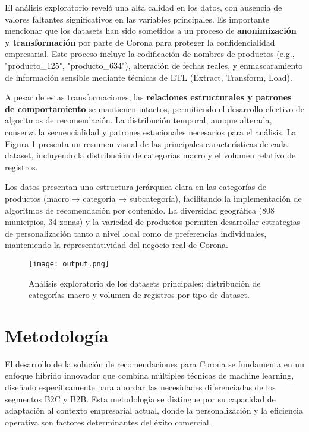 \documentclass[twocolumn]{article}
\begin{document}
El análisis exploratorio reveló una alta calidad en los datos, con ausencia de valores faltantes significativos en las variables principales. Es importante mencionar que los datasets han sido sometidos a un proceso de \textbf{anonimización y transformación} por parte de Corona para proteger la confidencialidad empresarial. Este proceso incluye la codificación de nombres de productos (e.g., "producto\_125", "producto\_634"), alteración de fechas reales, y enmascaramiento de información sensible mediante técnicas de ETL (Extract, Transform, Load).

A pesar de estas transformaciones, las \textbf{relaciones estructurales y patrones de comportamiento} se mantienen intactos, permitiendo el desarrollo efectivo de algoritmos de recomendación. La distribución temporal, aunque alterada, conserva la secuencialidad y patrones estacionales necesarios para el análisis. La Figura \ref{fig:analisis_exploratorio} presenta un resumen visual de las principales características de cada dataset, incluyendo la distribución de categorías macro y el volumen relativo de registros.

Los datos presentan una estructura jerárquica clara en las categorías de productos (macro → categoría → subcategoría), facilitando la implementación de algoritmos de recomendación por contenido. La diversidad geográfica (808 municipios, 34 zonas) y la variedad de productos permiten desarrollar estrategias de personalización tanto a nivel local como de preferencias individuales, manteniendo la representatividad del negocio real de Corona.

\begin{figure}[H]
\centering
\texttt{[image: output.png]}
\caption{Análisis exploratorio de los datasets principales: distribución de categorías macro y volumen de registros por tipo de dataset.}
\label{fig:analisis_exploratorio}
\end{figure}

\section{Metodología}

El desarrollo de la solución de recomendaciones para Corona se fundamenta en un enfoque híbrido innovador que combina múltiples técnicas de machine learning, diseñado específicamente para abordar las necesidades diferenciadas de los segmentos B2C y B2B. Esta metodología se distingue por su capacidad de adaptación al contexto empresarial actual, donde la personalización y la eficiencia operativa son factores determinantes del éxito comercial.
\end{document}
